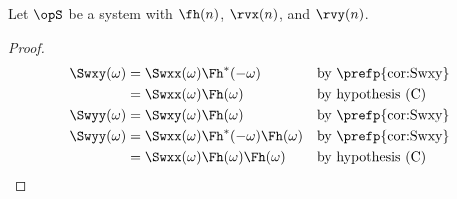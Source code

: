 \begin{corollary}
\label{cor:Swxy}
Let $\opS$ be a system with  $\fh(n)$,
 $\rvx(n)$, and  $\rvy(n)$.
\end{corollary}
\begin{proof}
\begin{align*}
   \Swxy(\omega)
     &= \Swxx(\omega) \Fh^\ast(-\omega)
     && \text{by \prefp{cor:Swxy}}
   \\&= \Swxx(\omega) \Fh(\omega)
     && \text{by hypothesis (C)}
   \\
   \Swyy(\omega)
     &= \Swxy(\omega) \Fh(\omega)
     && \text{by \prefp{cor:Swxy}}
   \\
   \Swyy(\omega)
     &= \Swxx(\omega) \Fh^\ast(-\omega) \Fh(\omega)
     && \text{by \prefp{cor:Swxy}}
   \\&= \Swxx(\omega) \Fh(\omega) \Fh(\omega)
     && \text{by hypothesis (C)}
\end{align*}
\end{proof}

